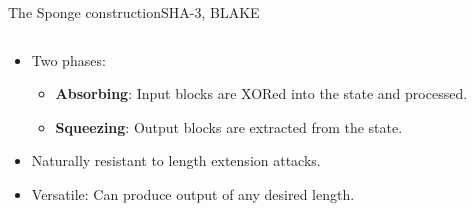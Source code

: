 \documentclass[aspectratio=169, lualatex, handout]{beamer}
\begin{document}
\begin{frame}{The Sponge construction}{SHA-3, BLAKE}
	\begin{columns}[c]
		\begin{column}{0.55\textwidth}
			\begin{itemize}[<+->]
				\item Two phases:
				      \begin{itemize}
					      \item \textbf{Absorbing}: Input blocks are XORed into the state and processed.
					      \item \textbf{Squeezing}: Output blocks are extracted from the state.
				      \end{itemize}
				\item Naturally resistant to length extension attacks.
				\item Versatile: Can produce output of any desired length.
			\end{itemize}
		\end{column}
		\begin{column}{0.45\textwidth}
		\end{column}
	\end{columns}
\end{frame}
\end{document}
